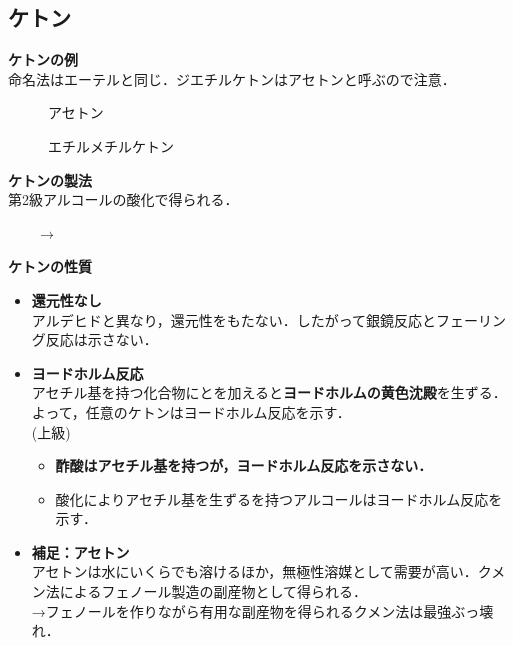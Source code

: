 \documentclass[a4paper,12pt]{ltjsreport}
\begin{document}
\subsection{ケトン}
\noindent \textbf{ケトンの例}\\
命名法はエーテルと同じ．ジエチルケトンは{\color{red}アセトン}と呼ぶので注意．\\
\begin{minipage}{0.5\linewidth}
\begin{figure}[H]
    \centering
\caption{アセトン} 
\end{figure}
\end{minipage}
\begin{minipage}{0.5\linewidth}
\begin{figure}[H]
    \centering
\caption{エチルメチルケトン} 
\end{figure}
\end{minipage}
\noindent \textbf{ケトンの製法}\\
第2級アルコールの酸化で得られる．\\[5pt]
\centerline{~~~~$\longrightarrow$~~~~}
\noindent \textbf{ケトンの性質}
\begin{itemize}
    \item\textbf{還元性なし}\\
    アルデヒドと異なり，還元性をもたない．したがって銀鏡反応とフェーリング反応は示さない．
    \item \textbf{ヨードホルム反応}\\
    アセチル基を持つ化合物にとを加えると{\color{red}\textbf{ヨードホルムの黄色沈殿}}を生ずる．よって，任意のケトンはヨードホルム反応を示す．\\[5pt]
    (上級)
    \begin{itemize}
    \item \textbf{酢酸はアセチル基を持つが，ヨードホルム反応を示さない．}
    \item 酸化によりアセチル基を生ずるを持つアルコールはヨードホルム反応を示す．
    \end{itemize}
    \item \textbf{補足：アセトン}\\
    アセトンは水にいくらでも溶けるほか，無極性溶媒として需要が高い．クメン法によるフェノール製造の副産物として得られる．\\
    →フェノールを作りながら有用な副産物を得られるクメン法は最強ぶっ壊れ．
\end{itemize}
\end{document}
